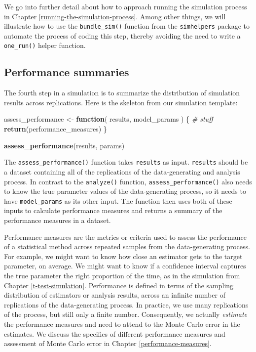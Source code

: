 \documentclass[
]{book}
\newenvironment{Shaded}{\begin{snugshade}}{\end{snugshade}}
\newcommand{\CommentTok}[1]{\textcolor[rgb]{0.56,0.35,0.01}{\textit{#1}}}
\newcommand{\ControlFlowTok}[1]{\textcolor[rgb]{0.13,0.29,0.53}{\textbf{#1}}}
\newcommand{\FunctionTok}[1]{\textcolor[rgb]{0.13,0.29,0.53}{\textbf{#1}}}
\newcommand{\NormalTok}[1]{#1}
\newcommand{\OtherTok}[1]{\textcolor[rgb]{0.56,0.35,0.01}{#1}}
\begin{document}
We go into further detail about how to approach running the simulation process in Chapter \ref{running-the-simulation-process}.
Among other things, we will illustrate how to use the \texttt{bundle\_sim()} function from the \texttt{simhelpers} package to automate the process of coding this step, thereby avoiding the need to write a \texttt{one\_run()} helper function.

\subsection{Performance summaries}\label{performance-summaries}

The fourth step in a simulation is to summarize the distribution of simulation results across replications.
Here is the skeleton from our simulation template:

\begin{Shaded}
\begin{Highlighting}[]
\NormalTok{assess\_performance }\OtherTok{\textless{}{-}} \ControlFlowTok{function}\NormalTok{( results, model\_params ) \{}
  \CommentTok{\# stuff}
  \FunctionTok{return}\NormalTok{(performance\_measures)}
\NormalTok{\}}

\FunctionTok{assess\_performance}\NormalTok{(results, params)}
\end{Highlighting}
\end{Shaded}

The \texttt{assess\_performance()} function takes \texttt{results} as input.
\texttt{results} should be a dataset containing all of the replications of the data-generating and analysis process.
In contrast to the \texttt{analyze()} function, \texttt{assess\_performance()} also needs to know the true parameter values of the data-generating process, so it needs to have \texttt{model\_params} as its other input.
The function then uses both of these inputs to calculate performance measures and returns a summary of the performance measures in a dataset.

Performance measures are the metrics or criteria used to assess the performance of a statistical method across repeated samples from the data-generating process.
For example, we might want to know how close an estimator gets to the target parameter, on average.
We might want to know if a confidence interval captures the true parameter the right proportion of the time, as in the simulation from Chapter \ref{t-test-simulation}.
Performance is defined in terms of the sampling distribution of estimators or analysis results, across an infinite number of replications of the data-generating process.
In practice, we use many replications of the process, but still only a finite number. Consequently, we actually \emph{estimate} the performance measures and need to attend to the Monte Carlo error in the estimates.
We discuss the specifics of different performance measures and assessment of Monte Carlo error in Chapter \ref{performance-measures}.
\end{document}
